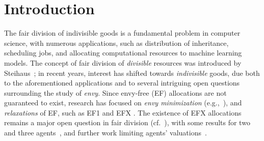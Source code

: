 \documentclass[11pt,letterpaper]{article}
\begin{document}
\clearpage


\section{Introduction}\label{sec:introduction}






    The fair division of indivisible goods is a fundamental problem in computer science, with numerous applications, such as distribution of inheritance, scheduling jobs, and allocating computational resources to machine learning models. The concept of fair division of \emph{divisible} resources was introduced by Steihaus~\cite{h__steihaus_1948}; in recent years, interest has shifted towards \emph{indivisible} goods, due both to the aforementioned applications and to several intriguing open questions surrounding the study of \emph{envy}. Since envy-free (EF) allocations are not guaranteed to exist, research has focused on \emph{envy minimization} (e.g.,~\cite{ISAAC_envy_ratio,LiptonEtAl,Nguyen_Rothe}),
    and \emph{relaxations} of EF, such as EF1 \cite{budish} and EFX \cite{EFXCara,Laurent_EFX}. The existence of EFX allocations remains a major open question in fair division (cf.~\cite{FD_survey}),
    with some results for two~\cite{PlautRough} and three agents~\cite{akrami2022efxallocationssimplificationsimprovements,CGM24}, and further work limiting agents' valuations~\cite{TwoValuedInstanses,babaioff2020fairtruthfulmechanismsdichotomous,DBLP:conf/aaai/HosseiniSVX21,efxexistsfor3typesofadditiveagents}.
\end{document}
